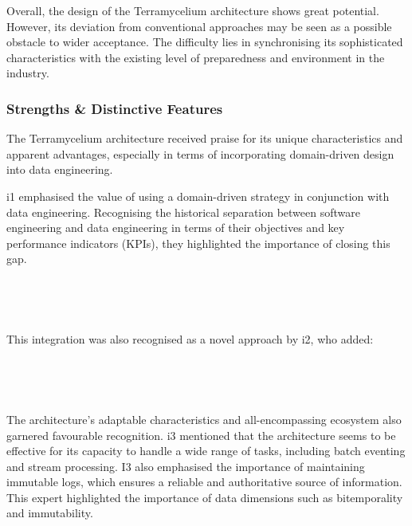 \documentclass[review]{elsarticle}
\begin{document}
Overall, the design of the Terramycelium architecture shows great potential. However, its deviation from conventional approaches may be seen as a possible obstacle to wider acceptance. The difficulty lies in synchronising its sophisticated characteristics with the existing level of preparedness and environment in the industry.

\subsubsection{Strengths \& Distinctive Features}

The Terramycelium architecture received praise for its unique characteristics and apparent advantages, especially in terms of incorporating domain-driven design into data engineering.

i1 emphasised the value of using a domain-driven strategy in conjunction with data engineering. Recognising the historical separation between software engineering and data engineering in terms of their objectives and key performance indicators (KPIs), they highlighted the importance of closing this gap.

\,

\setlength{\fboxsep}{0.3em}

\noindent{}

\,

This integration was also recognised as a novel approach by i2, who added:

\,

\setlength{\fboxsep}{0.3em}

\noindent{}

\,

The architecture's adaptable characteristics and all-encompassing ecosystem also garnered favourable recognition. i3 mentioned that the architecture seems to be effective for its capacity to handle a wide range of tasks, including batch eventing and stream processing. I3 also emphasised the importance of maintaining immutable logs, which ensures a reliable and authoritative source of information. This expert highlighted the importance of data dimensions such as bitemporality and immutability. 
\end{document}
